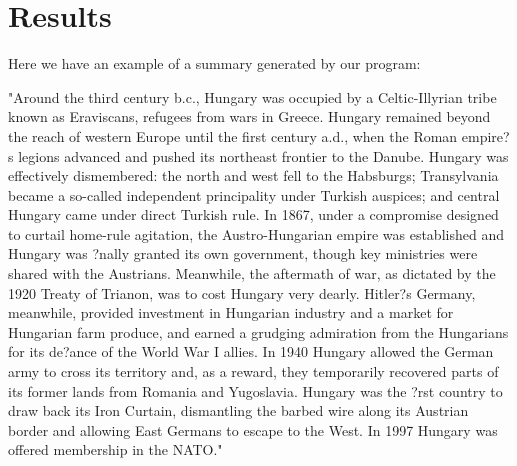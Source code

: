 \documentclass[12pt]{article}
\theoremstyle{plain}
\theoremstyle{definition}
\theoremstyle{remark}
\theoremstyle{plain}
\begin{document}
\section{Results}

	Here we have an example of a summary generated by our program: 
	\begin{center}
	
"Around the third century b.c., Hungary was occupied by a Celtic-Illyrian tribe known as Eraviscans, refugees from wars in Greece. Hungary remained beyond the reach of western Europe until the first century a.d., when the Roman empire?s legions advanced and pushed its northeast frontier to the Danube. Hungary was effectively dismembered: the north and west fell to the Habsburgs; Transylvania became a so-called independent principality under Turkish auspices; and central Hungary came under direct Turkish rule. In 1867, under a compromise designed to curtail home-rule agitation, the Austro-Hungarian empire was established and Hungary was ?nally granted its own government, though key ministries were shared with the Austrians. Meanwhile, the aftermath of war, as dictated by the 1920 Treaty of Trianon, was to cost Hungary very dearly. Hitler?s Germany, meanwhile, provided investment in Hungarian industry and a market for Hungarian farm produce, and earned a grudging admiration from the Hungarians for its de?ance of the World War I allies. In 1940 Hungary allowed the German army to cross its territory and, as a reward, they temporarily recovered parts of its former lands from Romania and Yugoslavia. Hungary was the ?rst country to draw back its Iron Curtain, dismantling the barbed wire along its Austrian border and allowing East Germans to escape to the West. In 1997 Hungary was offered membership in the NATO."

	\end{center}
	
\end{document}
